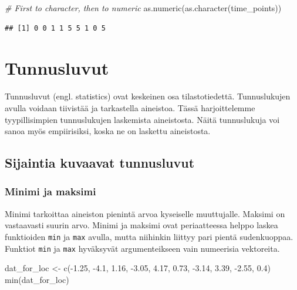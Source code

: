 \documentclass[
]{book}
\newenvironment{Shaded}{\begin{snugshade}}{\end{snugshade}}
\newcommand{\CommentTok}[1]{\textcolor[rgb]{0.56,0.35,0.01}{\textit{#1}}}
\newcommand{\FloatTok}[1]{\textcolor[rgb]{0.00,0.00,0.81}{#1}}
\newcommand{\FunctionTok}[1]{\textcolor[rgb]{0.00,0.00,0.00}{#1}}
\newcommand{\NormalTok}[1]{#1}
\newcommand{\OtherTok}[1]{\textcolor[rgb]{0.56,0.35,0.01}{#1}}
\newcommand{\SpecialCharTok}[1]{\textcolor[rgb]{0.00,0.00,0.00}{#1}}
\begin{document}
\begin{Shaded}
\begin{Highlighting}[]
\CommentTok{\# First to character, then to numeric}
\FunctionTok{as.numeric}\NormalTok{(}\FunctionTok{as.character}\NormalTok{(time\_points))}
\end{Highlighting}
\end{Shaded}

\begin{verbatim}
## [1] 0 0 1 1 5 5 1 0 5
\end{verbatim}

\hypertarget{statistics}{%
\chapter{Tunnusluvut}\label{statistics}}

Tunnusluvut (engl. statistics) ovat keskeinen osa tilastotiedettä. Tunnuslukujen avulla voidaan tiivistää ja tarkastella aineistoa. Tässä harjoittelemme tyypillisimpien tunnuslukujen laskemista aineistosta. Näitä tunnuslukuja voi sanoa myös empiirisiksi, koska ne on laskettu aineistosta.

\hypertarget{sijaintia-kuvaavat-tunnusluvut}{%
\section{Sijaintia kuvaavat tunnusluvut}\label{sijaintia-kuvaavat-tunnusluvut}}

\hypertarget{minimi-ja-maksimi}{%
\subsection{Minimi ja maksimi}\label{minimi-ja-maksimi}}

Minimi tarkoittaa aineiston pienintä arvoa kyseiselle muuttujalle. Maksimi on vastaavasti suurin arvo. Minimi ja maksimi ovat periaatteessa helppo laskea funktioiden \texttt{min} ja \texttt{max} avulla, mutta niihinkin liittyy pari pientä sudenkuoppaa. Funktiot \texttt{min} ja \texttt{max} hyväksyvät argumenteikseen vain numeerisia vektoreita.

\begin{Shaded}
\begin{Highlighting}[]
\NormalTok{dat\_for\_loc }\OtherTok{\textless{}{-}} \FunctionTok{c}\NormalTok{(}\SpecialCharTok{{-}}\FloatTok{1.25}\NormalTok{, }\SpecialCharTok{{-}}\FloatTok{4.1}\NormalTok{, }\FloatTok{1.16}\NormalTok{, }\SpecialCharTok{{-}}\FloatTok{3.05}\NormalTok{, }\FloatTok{4.17}\NormalTok{, }\FloatTok{0.73}\NormalTok{, }\SpecialCharTok{{-}}\FloatTok{3.14}\NormalTok{, }\FloatTok{3.39}\NormalTok{, }\SpecialCharTok{{-}}\FloatTok{2.55}\NormalTok{, }\FloatTok{0.4}\NormalTok{)}
\FunctionTok{min}\NormalTok{(dat\_for\_loc)}
\end{Highlighting}
\end{Shaded}
\end{document}

